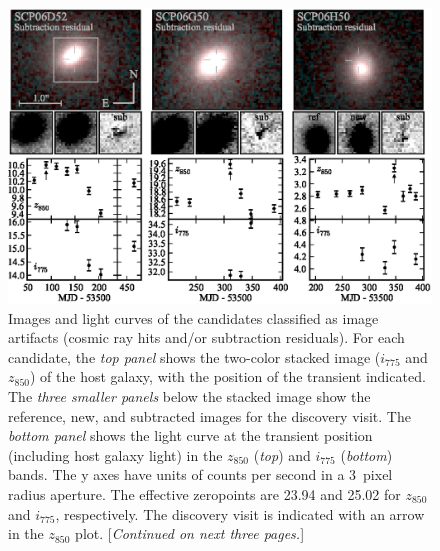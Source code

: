  

\begin{figure}[!b]
\includegraphics[width=\textwidth]{figures/cands/artifacts1.eps}
\caption[Images and light curves of candidates classified as artifacts]
        {Images and light curves of the candidates classified as image
         artifacts (cosmic ray hits and/or subtraction residuals). For
         each candidate, the \emph{top panel} shows the two-color
         stacked image ($i_{775}$ and $z_{850}$) of the host galaxy,
         with the position of the transient indicated.  The \emph{three
         smaller panels} below the stacked image show the reference,
         new, and subtracted images for the discovery visit. The \emph{bottom
         panel} shows the light curve at the transient position (including
         host galaxy light) in the $z_{850}$ ({\it top}) and $i_{775}$
         ({\it bottom}) bands. The y axes have units of counts per
         second in a $3$~pixel radius aperture. The effective
         zeropoints are 23.94 and 25.02 for $z_{850}$ and $i_{775}$,
         respectively. The discovery visit is indicated with an arrow
         in the $z_{850}$ plot. [\emph{Continued on next three pages.}]
         \label{fig:artifacts}}
\end{figure}

